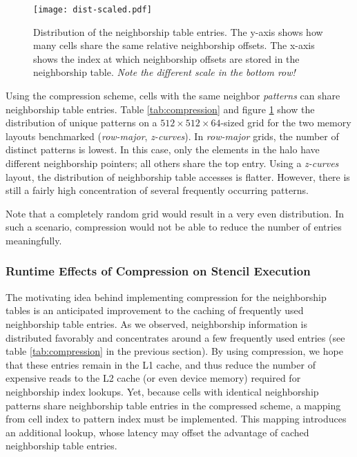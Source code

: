 \begin{figure}
	\begin{center}
		\texttt{[image: dist-scaled.pdf]}
		\caption{\label{fig:comp-dist} Distribution of the neighborship table entries. The y-axis shows how many cells share the same relative neighborship offsets. The x-axis shows the index at which neighborship offsets are stored in the neighborship table. \emph{Note the different scale in the bottom row!}}
	\end{center}
\end{figure}

Using the compression scheme, cells with the same neighbor \emph{patterns} can share neighborship table entries. Table \ref{tab:compression} and figure \ref{fig:comp-dist} show the distribution of unique patterns on a $512\times 512\times 64$-sized grid for the two memory layouts benchmarked (\emph{row-major}, \emph{z-curves}). In \emph{row-major} grids, the number of distinct patterns is lowest. In this case, only the elements in the halo have different neighborship pointers; all others share the top entry. Using a \emph{z-curves} layout, the distribution of neighborship table accesses is flatter. However, there is still a fairly high concentration of several frequently occurring patterns.

Note that a completely random grid would result in a very even distribution. In such a scenario, compression would not be able to reduce the number of entries meaningfully. 

\subsubsection{Runtime Effects of Compression on Stencil Execution}

The motivating idea behind implementing compression for the neighborship tables is an anticipated improvement to the caching of frequently used neighborship table entries. As we observed, neighborship information is distributed favorably and concentrates around a few frequently used entries (see table \ref{tab:compression} in the previous section). By using compression, we hope that these entries remain in the L1 cache, and thus reduce the number of expensive reads to the L2 cache (or even device memory) required for neighborship index lookups. Yet, because cells with identical neighborship patterns share neighborship table entries in the compressed scheme, a mapping from cell index to pattern index must be implemented. This mapping introduces an additional lookup, whose latency may offset the advantage of cached neighborship table entries.

